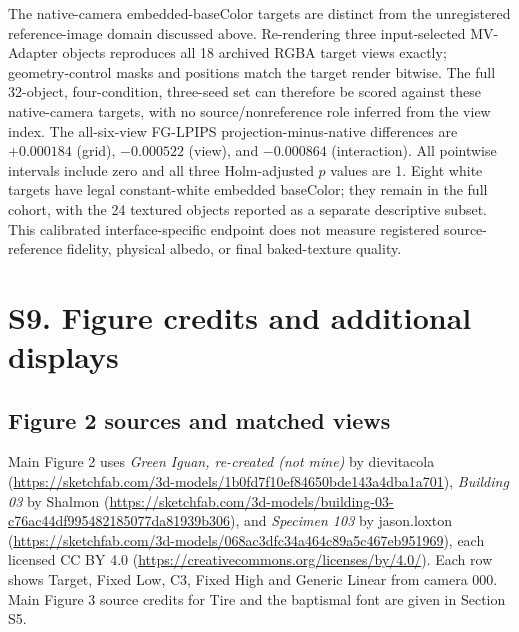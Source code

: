 \documentclass[11pt]{article}
\begin{document}
The native-camera embedded-baseColor targets are distinct from the unregistered
reference-image domain discussed above. Re-rendering three input-selected
MV-Adapter objects reproduces all 18 archived RGBA target views exactly;
geometry-control masks and positions match the target render bitwise.
The full 32-object, four-condition, three-seed set can therefore be scored
against these native-camera targets, with no source/nonreference role inferred
from the view index. The all-six-view FG-LPIPS projection-minus-native
differences are $+0.000184$ (grid), $-0.000522$ (view), and $-0.000864$
(interaction). All pointwise intervals include zero and all three Holm-adjusted
$p$ values are 1. Eight white targets have legal constant-white embedded
baseColor; they remain in the full cohort, with the 24 textured objects reported
as a separate descriptive subset. This calibrated interface-specific endpoint
does not measure registered source-reference fidelity, physical albedo, or
final baked-texture quality.

\FloatBarrier
\clearpage
\section*{S9. Figure credits and additional displays}
\label{supp:group9}

\subsection*{Figure 2 sources and matched views}
Main Figure 2 uses \emph{Green Iguan, re-created (not mine)} by dievitacola (\url{https://sketchfab.com/3d-models/1b0fd7f10ef84650bde143a4dba1a701}), \emph{Building 03} by Shalmon (\url{https://sketchfab.com/3d-models/building-03-c76ac44df995482185077da81939b306}), and \emph{Specimen 103} by jason.loxton (\url{https://sketchfab.com/3d-models/068ac3dfc34a464c89a5c467eb951969}), each licensed CC BY 4.0 (\url{https://creativecommons.org/licenses/by/4.0/}). Each row shows Target, Fixed Low, C3, Fixed High and Generic Linear from camera 000. Main Figure 3 source credits for Tire and the baptismal font are given in Section S5.
\end{document}

